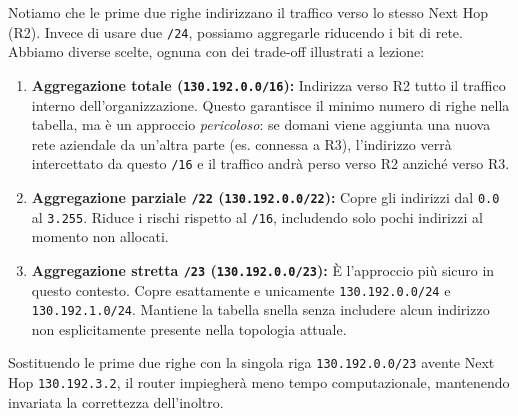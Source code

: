 Notiamo che le prime due righe indirizzano il traffico verso lo stesso Next Hop (R2). Invece di usare due \texttt{/24}, possiamo aggregarle riducendo i bit di rete.
Abbiamo diverse scelte, ognuna con dei trade-off illustrati a lezione:
\begin{enumerate}
    \item \textbf{Aggregazione totale (\texttt{130.192.0.0/16}):} Indirizza verso R2 tutto il traffico interno dell'organizzazione. Questo garantisce il minimo numero di righe nella tabella, ma è un approccio \textit{pericoloso}: se domani viene aggiunta una nuova rete aziendale da un'altra parte (es. connessa a R3), l'indirizzo verrà intercettato da questo \texttt{/16} e il traffico andrà perso verso R2 anziché verso R3. 
    \item \textbf{Aggregazione parziale \texttt{/22} (\texttt{130.192.0.0/22}):} Copre gli indirizzi dal \texttt{0.0} al \texttt{3.255}. Riduce i rischi rispetto al \texttt{/16}, includendo solo pochi indirizzi al momento non allocati.
    \item \textbf{Aggregazione stretta \texttt{/23} (\texttt{130.192.0.0/23}):} È l'approccio più sicuro in questo contesto. Copre esattamente e unicamente \texttt{130.192.0.0/24} e \texttt{130.192.1.0/24}. Mantiene la tabella snella senza includere alcun indirizzo non esplicitamente presente nella topologia attuale.
\end{enumerate}

Sostituendo le prime due righe con la singola riga \texttt{130.192.0.0/23} avente Next Hop \texttt{130.192.3.2}, il router impiegherà meno tempo computazionale, mantenendo invariata la correttezza dell'inoltro.